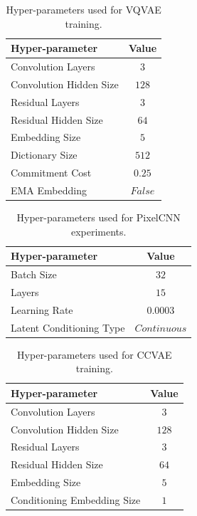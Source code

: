 \begin{table}[h!]
    \centering
    \begin{tabular}{L{5cm}|c}
    \hline
    \textbf{Hyper-parameter} & \textbf{Value} \\
    \hline
    Convolution Layers & $3$\\
    Convolution Hidden Size & $128$\\
    Residual Layers & $3$\\
    Residual Hidden Size & $64$\\
    Embedding Size & $5$\\
    Dictionary Size & $512$\\
    Commitment Cost & $0.25$\\
    EMA Embedding & $False$\\
    \hline
    \end{tabular}
\caption{Hyper-parameters used for VQVAE training.}
\label{table:vqvae-hyperparams}
\end{table}

\begin{table}[h!]
    \centering
    \begin{tabular}{L{5cm}|c}
    \hline
    \textbf{Hyper-parameter} & \textbf{Value} \\
    \hline
    Batch Size & $32$\\
    Layers & $15$\\
    Learning Rate & $0.0003$\\
    Latent Conditioning Type & $Continuous$\\
    \hline
    \end{tabular}
\caption{Hyper-parameters used for PixelCNN experiments.}
\label{table:pixelcnn-hyperparams}
\end{table}

\begin{table}[h!]
    \centering
    \begin{tabular}{L{6cm}|c}
    \hline
    \textbf{Hyper-parameter} & \textbf{Value} \\
    \hline
    Convolution Layers & $3$\\
    Convolution Hidden Size & $128$\\
    Residual Layers & $3$\\
    Residual Hidden Size & $64$\\
    Embedding Size & $5$\\
    Conditioning Embedding Size & $1$\\
    \hline
    \end{tabular}
\caption{Hyper-parameters used for CCVAE training.}
\label{table:ccvae-hyperparams}
\end{table}

